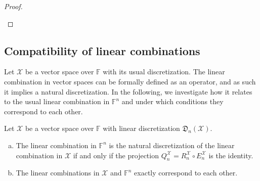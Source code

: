 \documentclass[a4paper]{paper}
\newcommand{\Discr}{\mathfrak{D}}
\newcommand{\Spc}[1]{\mathscr{#1}}
\newcommand{\Field}{\mathbb{F}}
\newcommand*{\EXT}[2]{\ensuremath{E_{#1}^{#2}}}
\newcommand*{\REST}[2]{\ensuremath{R_{#1}^{#2}}}
\newcommand*{\COPROJ}[2]{\ensuremath{Q_{#1}^{#2}}}
\newcommand*{\RnX}{\ensuremath{\REST{n}{\Spc{X}}}}
\newcommand*{\EnX}{\ensuremath{\EXT{n}{\Spc{X}}}}
\newcommand*{\QnX}{\ensuremath{\COPROJ{n}{\Spc{X}}}}
\begin{document}
\begin{proof}
\begin{enumerate}[(a)]
 \end{enumerate}
\end{proof}



\subsection{Compatibility of linear combinations}
\label{subsec:prop:lincomb}

Let $\Spc{X}$ be a vector space over $\Field$ with its usual discretization. The linear combination in vector spaces 
can be formally defined as an operator, and as such it implies a natural discretization. In the following, we 
investigate how it relates to the usual linear combination in $\Field^n$ and under which conditions they correspond to 
each other.


\begin{lemma}
 \label{lemma:prop:lincomb:natural_corresp}
 Let $\Spc{X}$ be a vector space over $\Field$ with linear discretization $\Discr_{n}(\Spc{X})$.
 \begin{enumerate}[(a)]
  \item The linear combination in $\Field^n$ is the natural discretization of the linear combination in $\Spc{X}$ if 
  and only if the projection $\QnX = \RnX \circ \EnX$ is the identity.
  
  \item The linear combinations in $\Spc{X}$ and $\Field^n$ exactly correspond to each other.
 \end{enumerate}
\end{lemma}
\vspace{1em}
\end{document}
